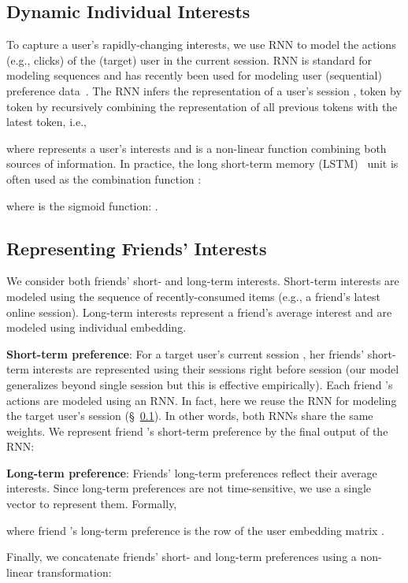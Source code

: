 \documentclass[sigconf]{acmart}
\begin{document}
\subsection{Dynamic Individual Interests} \label{sec:dynamic_individual_interests}
To capture a user's rapidly-changing interests, we use RNN to model the actions (e.g., clicks) of the (target) user in the current session.
RNN is standard for modeling sequences and has recently been used for modeling user (sequential) preference data~\cite{hidasi2016session}. The RNN infers the representation of a user's 
session , token by token by recursively combining the representation of all previous tokens with the latest token, i.e., 

where  represents a user's interests and  is a non-linear function combining both sources of information. In practice, the long short-term memory (LSTM)~\cite{hochreiter1997long} unit is often used as the combination function :

where  is the sigmoid function: . 

\subsection{Representing Friends' Interests}
\label{sec:rep_of_friends}
We consider both friends' short- and long-term interests. 
Short-term interests are modeled using the sequence of recently-consumed items (e.g., a friend's latest online session).
Long-term interests represent a friend's average interest and are modeled using individual embedding.

\textbf{Short-term preference}: For a target user's current session , her friends' short-term interests are represented 
using their sessions right before session  (our model generalizes beyond single session but this is effective empirically). Each friend 's actions  are modeled using an RNN. In fact, here we reuse the RNN for modeling the target user's session (\S~\ref{sec:dynamic_individual_interests}). In other words, both RNNs share the same weights.
We represent friend 's short-term preference  by the final output of the RNN:


\textbf{Long-term preference}: Friends' long-term preferences reflect their average interests.
Since long-term preferences are not time-sensitive, we use a single vector to represent them. Formally,

where friend 's long-term preference  is the  row of the user embedding matrix .

Finally, we concatenate friends' short- and long-term preferences using a non-linear transformation:
\end{document}
